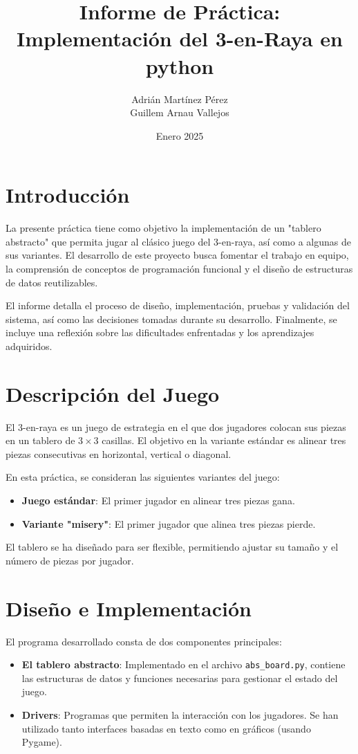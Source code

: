 \documentclass[a4paper,11pt]{article}
\title{Informe de Práctica: Implementación del 3-en-Raya en python}
\author{Adrián Martínez Pérez \\ Guillem Arnau Vallejos}
\date{Enero 2025}
\begin{document}
\maketitle
\tableofcontents
\newpage

\section{Introducción}
La presente práctica tiene como objetivo la implementación de un "tablero abstracto" que permita jugar al clásico juego del 3-en-raya, así como a algunas de sus variantes. El desarrollo de este proyecto busca fomentar el trabajo en equipo, la comprensión de conceptos de programación funcional y el diseño de estructuras de datos reutilizables.

El informe detalla el proceso de diseño, implementación, pruebas y validación del sistema, así como las decisiones tomadas durante su desarrollo. Finalmente, se incluye una reflexión sobre las dificultades enfrentadas y los aprendizajes adquiridos.

\section{Descripción del Juego}
El 3-en-raya es un juego de estrategia en el que dos jugadores colocan sus piezas en un tablero de $3 \times 3$ casillas. El objetivo en la variante estándar es alinear tres piezas consecutivas en horizontal, vertical o diagonal.

En esta práctica, se consideran las siguientes variantes del juego:
\begin{itemize}
    \item \textbf{Juego estándar}: El primer jugador en alinear tres piezas gana.
    \item \textbf{Variante "misery"}: El primer jugador que alinea tres piezas pierde.
\end{itemize}

El tablero se ha diseñado para ser flexible, permitiendo ajustar su tamaño y el número de piezas por jugador.

\section{Diseño e Implementación}
El programa desarrollado consta de dos componentes principales:
\begin{itemize}
    \item \textbf{El tablero abstracto}: Implementado en el archivo \texttt{abs\_board.py}, contiene las estructuras de datos y funciones necesarias para gestionar el estado del juego.
    \item \textbf{Drivers}: Programas que permiten la interacción con los jugadores. Se han utilizado tanto interfaces basadas en texto como en gráficos (usando Pygame).
\end{itemize}
\end{document}
